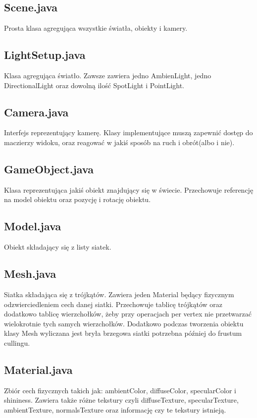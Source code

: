 \documentclass[onecolumn]{article}
\begin{document}
\subsection{Scene.java}
Prosta klasa agregująca wszystkie światła, obiekty i kamery.

\subsection{LightSetup.java}
Klasa agregująca światło. Zawsze zawiera jedno AmbienLight, jedno DirectionalLight oraz dowolną ilość SpotLight i PointLight.

\subsection{Camera.java}
Interfejs reprezentujący kamerę. Klasy implementujące muszą zapewnić dostęp do maczierzy widoku, oraz reagować w jakiś sposób na ruch i obrót(albo i nie).

\subsection{GameObject.java}
Klasa reprezentująca jakiś obiekt znajdujący się w świecie. Przechowuje referencję na model obiektu oraz pozycję i rotację obiektu.

\subsection{Model.java}
Obiekt składający się z listy siatek.

\subsection{Mesh.java}
Siatka składająca się z trójkątów. Zawiera jeden Material będący fizycznym odzwierciedleniem cech danej siatki. Przechowuje tablicę trójkątów oraz dodatkowo tablicę wierzchołków, żeby przy operacjach per vertex nie przetwarzać wielokrotnie tych samych wierzchołków. Dodatkowo podczas tworzenia obiektu klasy Mesh wyliczana jest bryła brzegowa siatki potrzebna później do frustum cullingu.

\subsection{Material.java}
Zbiór cech fizycznych takich jak: ambientColor, diffuseColor, specularColor i shininess. Zawiera także różne tekstury czyli diffuseTexture, specularTexture, ambientTexture, normalsTexture oraz informację czy te tekstury istnieją.
\end{document}
